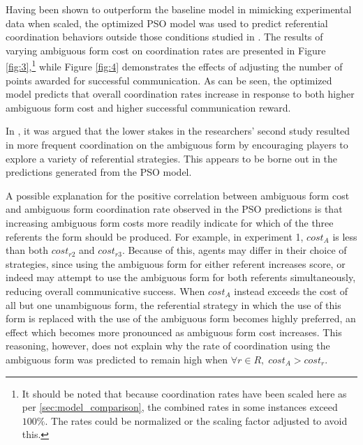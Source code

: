 \documentclass[a4paper,11pt]{article}
\begin{document}
Having been shown to outperform the baseline model in mimicking experimental data when scaled, the optimized PSO model was used to predict referential coordination behaviors outside those conditions studied in \citeauthor{rohde2012}. The results of varying ambiguous form cost on coordination rates are presented in Figure \ref{fig:3},\footnote{It should be noted that because coordination rates have been scaled here as per \ref{sec:model_comparison}, the combined rates in some instances exceed $100\%$. The rates could be normalized or the scaling factor adjusted to avoid this.} while Figure \ref{fig:4} demonstrates the effects of adjusting the number of points awarded for successful communication. As can be seen, the optimized model predicts that overall coordination rates increase in response to both higher ambiguous form cost and higher successful communication reward.

In \citeauthor{rohde2012}, it was argued that the lower stakes in the researchers' second study resulted in more frequent coordination on the ambiguous form by encouraging players to explore a variety of referential strategies. This appears to be borne out in the predictions generated from the PSO model.

A possible explanation for the positive correlation between ambiguous form cost and ambiguous form coordination rate observed in the PSO predictions is that increasing ambiguous form costs more readily indicate for which of the three referents the form should be produced. For example, in experiment 1, $cost_A$ is less than both $cost_{r2}$ and $cost_{r3}$. Because of this, agents may differ in their choice of strategies, since using the ambiguous form for either referent increases score, or indeed may attempt to use the ambiguous form for both referents simultaneously, reducing overall communicative success. When $cost_A$ instead exceeds the cost of all but one unambiguous form, the referential strategy in which the use of this form is replaced with the use of the ambiguous form becomes highly preferred, an effect which becomes more pronounced as ambiguous form cost increases. This reasoning, however, does not explain why the rate of coordination using the ambiguous form was predicted to remain high when $\forall r \in R,\; cost_A > cost_r$.
\end{document}
